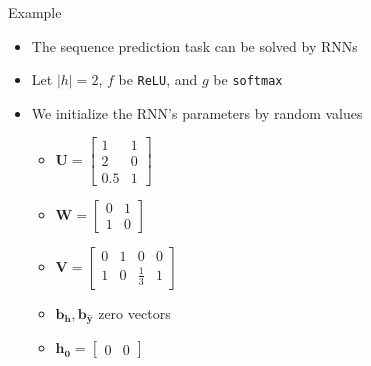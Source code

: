 \begin{frame}{Example}
    \begin{itemize}
        \item The sequence prediction task can be solved by RNNs
        \item Let $|h| = 2$, $f$ be \texttt{ReLU}, and $g$ be \texttt{softmax}
        \item We initialize the RNN's parameters by random values
        \begin{itemize}
            \item $\bm{U} = \begin{bmatrix}  1 & 1 \\ 2 & 0 \\ 0.5 & 1 \end{bmatrix}$
            \item $\bm{W} = \begin{bmatrix}  0 & 1 \\ 1 & 0 \end{bmatrix}$
            \item $\bm{V} = \begin{bmatrix}  0 & 1 & 0 & 0  \\ 1 & 0 & \frac{1}{3} & 1 \end{bmatrix}$
            \item $\bm{b_h},\bm{b_{\hat{y}}}$ zero vectors
            \item $\bm{h_0} = \begin{bmatrix} 0 & 0 \end{bmatrix}$
        \end{itemize}
    \end{itemize}
\end{frame}

